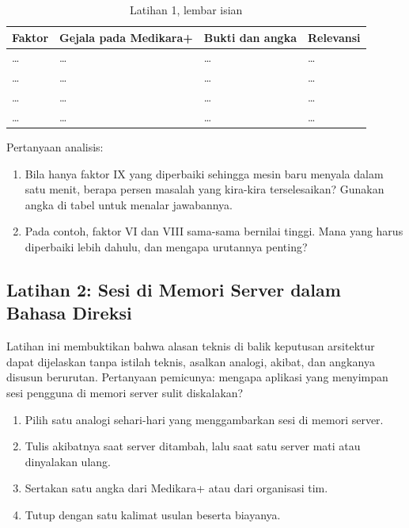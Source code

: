 \begin{table}[!htb]
  \centering
  \footnotesize
  \caption{Latihan 1, lembar isian}
  \label{tab:ch05-lat1-hasil}
  \begin{tabularx}{\textwidth}{>{\raggedright\arraybackslash}p{2.3cm}
    >{\raggedright\arraybackslash}X >{\raggedright\arraybackslash}X
    >{\raggedright\arraybackslash}p{1.4cm}}
    \hline
    \textbf{Faktor} & \textbf{Gejala pada Medikara+} & \textbf{Bukti dan angka} &
      \textbf{Relevansi} \\
    \hline
    \dots & \dots & \dots & \dots \\ \hline
    \dots & \dots & \dots & \dots \\ \hline
    \dots & \dots & \dots & \dots \\ \hline
    \dots & \dots & \dots & \dots \\ \hline
  \end{tabularx}
\end{table}

Pertanyaan analisis:
\begin{enumerate}
  \item Bila hanya faktor IX yang diperbaiki sehingga mesin baru menyala dalam satu menit,
        berapa persen masalah yang kira-kira terselesaikan? Gunakan angka di tabel untuk
        menalar jawabannya.
  \item Pada contoh, faktor VI dan VIII sama-sama bernilai tinggi. Mana yang harus
        diperbaiki lebih dahulu, dan mengapa urutannya penting?
\end{enumerate}

\subsection*{Latihan 2: Sesi di Memori Server dalam Bahasa Direksi}

Latihan ini membuktikan bahwa alasan teknis di balik keputusan arsitektur dapat dijelaskan
tanpa istilah teknis, asalkan analogi, akibat, dan angkanya disusun berurutan. Pertanyaan
pemicunya: mengapa aplikasi yang menyimpan sesi pengguna di memori server sulit
diskalakan?

\begin{enumerate}
  \item Pilih satu analogi sehari-hari yang menggambarkan sesi di memori server.
  \item Tulis akibatnya saat server ditambah, lalu saat satu server mati atau dinyalakan
        ulang.
  \item Sertakan satu angka dari Medikara+ atau dari organisasi tim.
  \item Tutup dengan satu kalimat usulan beserta biayanya.
\end{enumerate}


